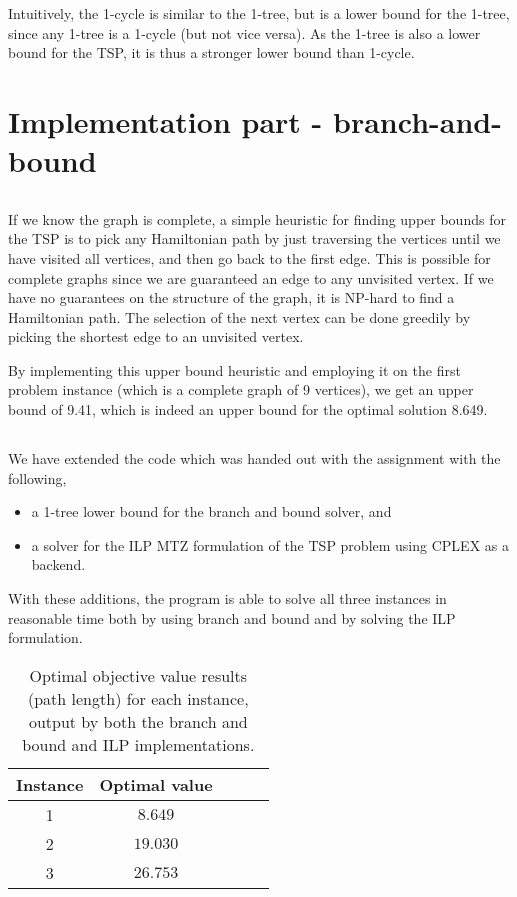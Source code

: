 \documentclass[11pt,a4paper,english]{article}
\begin{document}
Intuitively, the 1-cycle is similar to the 1-tree, but is a lower bound for the 1-tree, since any 1-tree is a 1-cycle (but not vice versa). As the 1-tree is also a lower bound for the TSP, it is thus a stronger lower bound than 1-cycle.
\clearpage

\section{Implementation part - branch-and-bound}

\subsection{}
If we know the graph is complete, a simple heuristic for finding upper bounds for the TSP is to pick any Hamiltonian path by just traversing the vertices until we have visited all vertices, and then go back to the first edge. This is possible for complete graphs since we are guaranteed an edge to any unvisited vertex. If we have no guarantees on the structure of the graph, it is NP-hard to find a Hamiltonian path. The selection of the next vertex can be done greedily by picking the shortest edge to an unvisited vertex.

By implementing this upper bound heuristic and employing it on the first problem instance (which is a complete graph of 9 vertices), we get an upper bound of 9.41, which is indeed an upper bound for the optimal solution 8.649.

\subsection{}
We have extended the code which was handed out with the assignment with the following,
\begin{itemize}
\item a 1-tree lower bound for the branch and bound solver, and
\item a solver for the ILP MTZ formulation of the TSP problem using CPLEX as a backend.
\end{itemize}
With these additions, the program is able to solve all three instances in reasonable time both by using branch and bound and
 by solving the ILP formulation.

 \begin{table}[h!]
  \centering
  \begin{tabular}{|c|c|c|c|c|}\hline
    Instance & Optimal value \\\hline
    1 &$8.649$ \\
    2 &$19.030$ \\
    3 &$26.753$ \\\hline
  \end{tabular}
  \caption{Optimal objective value results (path length) for each instance, output by both the branch and bound and ILP implementations.}
  \label{tab:res}
\end{table}
\end{document}
